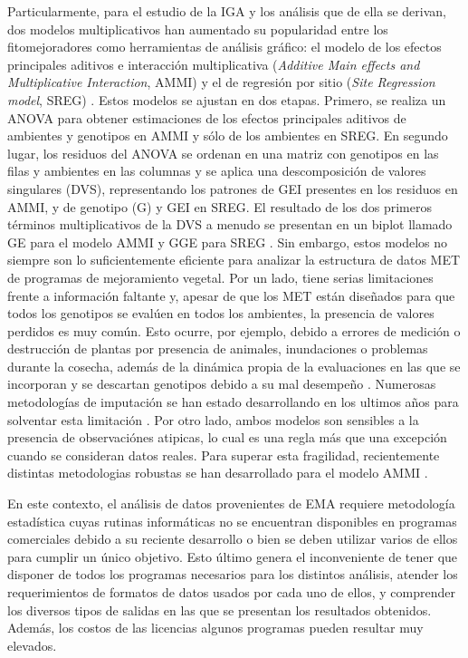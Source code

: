 Particularmente, para el estudio de la IGA y los análisis que de ella se derivan, dos modelos multiplicativos han aumentado su popularidad entre los fitomejoradores como herramientas de análisis gráfico: el modelo de los efectos principales aditivos e interacción multiplicativa (\emph{Additive Main effects and Multiplicative Interaction}, AMMI) \citep{Kempton1984,Gauch1988} y el de regresión por sitio (\emph{Site Regression model}, SREG) \citep{Corneliusetal1996, GauchZobel1997}. Estos modelos se ajustan en dos etapas. Primero, se realiza un ANOVA para obtener estimaciones de los efectos principales aditivos de ambientes y genotipos en AMMI y sólo de los ambientes en SREG. En segundo lugar, los residuos del ANOVA se ordenan en una matriz con genotipos en las filas y ambientes en las columnas y se aplica una descomposición de valores singulares (DVS), representando los patrones de GEI presentes en los residuos en AMMI, y de genotipo (G) y GEI en SREG. El resultado de los dos primeros términos multiplicativos de la DVS a menudo se presentan en un biplot llamado GE para el modelo AMMI y GGE para SREG \citep{YanHunt2002}. Sin embargo, estos modelos no siempre son lo suficientemente eficiente para analizar la estructura de datos MET de programas de mejoramiento vegetal. Por un lado, tiene serias limitaciones frente a información faltante y, apesar de que los MET están diseñados para que todos los genotipos se evalúen en todos los ambientes, la presencia de valores perdidos es muy común. Esto ocurre, por ejemplo, debido a errores de medición o destrucción de plantas por presencia de animales, inundaciones o problemas durante la cosecha, además de la dinámica propia de la evaluaciones en las que se incorporan y se descartan genotipos debido a su mal desempeño \citep{HillRosenberg1985}. Numerosas metodologías de imputación se han estado desarrollando en los ultimos años para solventar esta limitación \citep{Alarconetal2010, Alarconetal2014}. Por otro lado, ambos modelos son sensibles a la presencia de observaciónes atipicas, lo cual es una regla más que una excepción cuando se consideran datos reales. Para superar esta fragilidad, recientemente distintas metodologias robustas se han desarrollado para el modelo AMMI \citep{Rodriguesetal2016}. 

En este contexto, el análisis de datos provenientes de EMA requiere metodología estadística cuyas rutinas informáticas no se encuentran disponibles en programas comerciales debido a su reciente desarrollo o bien se deben utilizar varios de ellos para cumplir un único objetivo. Esto último genera el inconveniente de tener que disponer de todos los programas necesarios para los distintos análisis, atender los requerimientos de formatos de datos usados por cada uno de ellos, y comprender los diversos tipos de salidas en las que se presentan los resultados obtenidos. Además, los costos de las licencias algunos programas pueden resultar muy elevados. 

